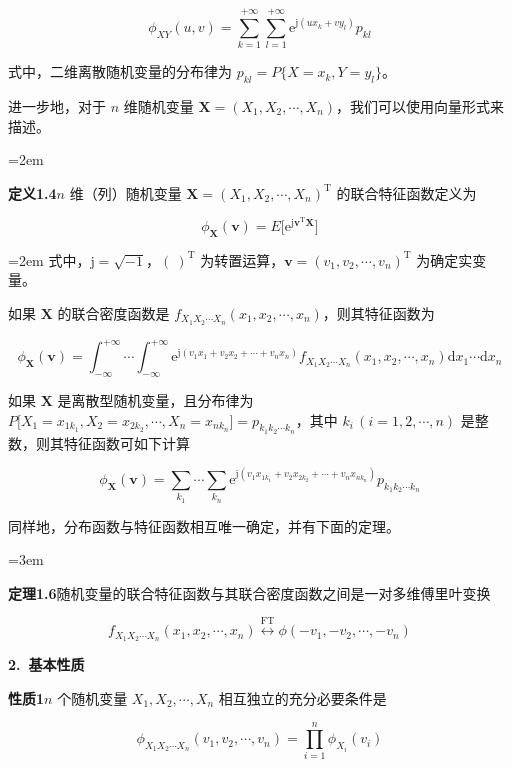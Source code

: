 \documentclass[11pt,openany,UTF8]{ctexbook}
\newcommand{\dif}{\mathrm{d}}                      %
\newcommand{\eu}{\mathrm{e}}                       %
\newcommand{\ju}{\mathrm{j}}                       %
\newcommand{\bX}{\bm{X}}
\newcommand{\bhead}[1]{\par\medskip\noindent\textbf{#1}\par\smallskip}
\newcommand{\thm}[1]{\par\medskip\noindent\textbf{#1}\quad}
\begin{document}
\[
\phi_{XY}(u,v)=\sum_{k=1}^{+\infty}\sum_{l=1}^{+\infty}\eu^{\ju(ux_k+vy_l)}p_{kl}
\]

式中\nobreak，二维离散随机变量的分布律为 $p_{kl}=P\{X=x_k,Y=y_l\}$\nobreak。

进一步地\nobreak，对于 $n$ 维随机变量 $\bX=(X_1,X_2,\cdots,X_n)$\nobreak，我们可以使用向量形式来描述\nobreak。

{\emergencystretch=2em \thm{定义1.4}$n$ 维（列\nobreak）随机变量 $\bX=(X_1,X_2,\cdots,X_n)^{\mathrm{T}}$ 的联合特征函数定义为\par}

\begin{equation}
\phi_{\bX}(\bm{v})=E\bigl[\eu^{\ju\bm{v}^{\mathrm{T}}\bX}\bigr]
\label{eq:1.67}
\end{equation}

{\emergencystretch=2em 式中\nobreak，$\ju=\sqrt{-1}$\nobreak，$(\ )^{\mathrm{T}}$ 为转置运算\nobreak，$\bm{v}=(v_1,v_2,\cdots,v_n)^{\mathrm{T}}$ 为确定实变量\nobreak。\par}

如果 $\bX$ 的联合密度函数是 $f_{X_1X_2\cdots X_n}(x_1,x_2,\cdots,x_n)$\nobreak，则其特征函数为

\[
\phi_{\bX}(\bm{v})=\int_{-\infty}^{+\infty}\!\!\cdots\!\!\int_{-\infty}^{+\infty}
\eu^{\ju(v_1x_1+v_2x_2+\cdots+v_nx_n)}
f_{X_1X_2\cdots X_n}(x_1,x_2,\cdots,x_n)\dif x_1\!\cdots\!\dif x_n
\]

如果 $\bX$ 是离散型随机变量\nobreak，且分布律为 $P\bigl[X_1=x_{1k_1},\allowbreak X_2=x_{2k_2},\allowbreak\cdots,\allowbreak X_n=x_{nk_n}\bigr]\allowbreak=p_{k_1k_2\cdots k_n}$\nobreak，其中 $k_i\,(i=1,2,\cdots,n)$ 是整数\nobreak，则其特征函数可如下计算

\[
\phi_{\bX}(\bm{v})=\sum_{k_1}\cdots\sum_{k_n}
\eu^{\ju(v_1x_{1k_1}+v_2x_{2k_2}+\cdots+v_nx_{nk_n})}p_{k_1k_2\cdots k_n}
\]

同样地\nobreak，分布函数与特征函数相互唯一确定\nobreak，并有下面的定理\nobreak。

{\emergencystretch=3em \thm{定理1.6}随机变量的联合特征函数与其联合密度函数之间是一对多维傅里叶变换\par}

\[
f_{X_1X_2\cdots X_n}(x_1,x_2,\cdots,x_n)\overset{\mathrm{FT}}{\longleftrightarrow}
\phi(-v_1,-v_2,\cdots,-v_n)
\]

\bhead{2.\ 基本性质}

\thm{性质1}$n$ 个随机变量 $X_1,X_2,\cdots,X_n$ 相互独立的充分必要条件是

\[
\phi_{X_1X_2\cdots X_n}(v_1,v_2,\cdots,v_n)=\prod_{i=1}^{n}\phi_{X_i}(v_i)
\]
\end{document}
